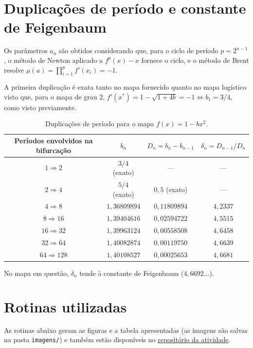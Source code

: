 \documentclass[9pt,a4paper]{tau-class/tau}
\theoremstyle{definition}
\numberwithin{definition}{subsection}
\numberwithin{theorem}{subsection}
\numberwithin{example}{subsection}
\numberwithin{observation}{subsection}
\numberwithin{lemma}{subsection}
\begin{document}
\section{Duplicações de período e constante de Feigenbaum}

Os parâmetros $a_n$ são obtidos considerando que, para o ciclo de período $p = 2^{n-1}$, o método de Newton aplicado a $f^{p}(x) - x$ fornece o ciclo, e o
método de Brent resolve $\mu(a) = \prod_{i=1}^{p} f'(x_i) = -1$. 

A primeira duplicação é exata tanto no mapa fornecido quanto no mapa logístico visto que, para o mapa de grau 2, $f'(x^*) = 1 - \sqrt{1+4b} = -1 \iff b_1 = 3/4$, como visto previamente.

\begin{table}[H]
\centering
\caption{Duplicações de período para o mapa $f(x) = 1 - bx^2$.}
\begin{tabular}{c|ccc}
\hline
Períodos envolvidos na bifurcação & $b_n$ & $D_n = b_n - b_{n-1}$ & $\delta_n = D_{n-1}/D_n$ \\ \hline
$1 \Rightarrow 2$     & $3/4$ (exato) & ---          & ---      \\
$2 \Rightarrow 4$     & $5/4$ (exato) & $0{,}5$ (exato) & ---   \\
$4 \Rightarrow 8$     & $1{,}36809894$ & $0{,}11809894$ & $4{,}2337$ \\
$8 \Rightarrow 16$    & $1{,}39404616$ & $0{,}02594722$ & $4{,}5515$ \\
$16 \Rightarrow 32$   & $1{,}39963124$ & $0{,}00558508$ & $4{,}6458$ \\
$32 \Rightarrow 64$   & $1{,}40082874$ & $0{,}00119750$ & $4{,}6639$ \\
$64 \Rightarrow 128$  & $1{,}40108527$ & $0{,}00025653$ & $4{,}6681$ \\ \hline
\end{tabular}
\end{table}

No mapa em questão, $\delta_n$ tende à constante de Feigenbaum ($4{,}6692\ldots$).

\appendix
\section{Rotinas utilizadas}

As rotinas abaixo geram as figuras e a tabela apresentadas (as imagens são salvas na pasta \texttt{imagens/}) e também estão disponíveis no \href{https://github.com/asandonato1/Caos2026_AA1/tree/main}{repositório da atividade}.
\end{document}
